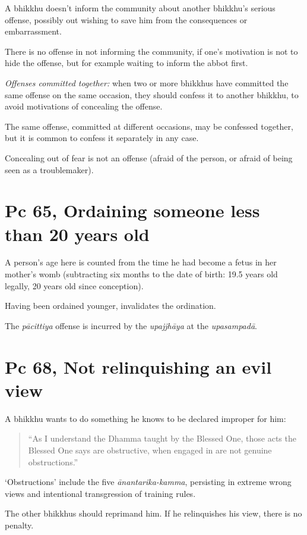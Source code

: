 A bhikkhu doesn't inform the community about another bhikkhu's serious
offense, possibly out wishing to save him from the consequences or
embarrassment.

There is no offense in not informing the community, if one's motivation
is not to hide the offense, but for example waiting to inform the abbot
first.

\emph{Offenses committed together:} when two or more bhikkhus have
committed the same offense on the same occasion, they should confess it
to another bhikkhu, to avoid motivations of concealing the offense.

The same offense, committed at different occasions, may be confessed
together, but it is common to confess it separately in any case.

Concealing out of fear is not an offense (afraid of the person, or
afraid of being seen as a troublemaker).

\clearpage

\section{Pc 65, Ordaining someone less than 20 years old}

A person's age here is counted from the time he had become a fetus in
her mother's womb (subtracting six months to the date of birth: 19.5
years old legally, 20 years old since conception).

Having been ordained younger, invalidates the ordination.

The \emph{pācittiya} offense is incurred by the \emph{upajjhāya} at the
\emph{upasampadā}.

\section{Pc 68, Not relinquishing an evil view}

A bhikkhu wants to do something he knows to be declared improper for
him:

\begin{quote}
``As I understand the Dhamma taught by the Blessed One, those acts the
Blessed One says are obstructive, when engaged in are not genuine
obstructions.''
\end{quote}

`Obstructions' include the five \emph{ānantarika-kamma}, persisting in
extreme wrong views and intentional transgression of training rules.

The other bhikkhus should reprimand him. If he relinquishes his view,
there is no penalty.

